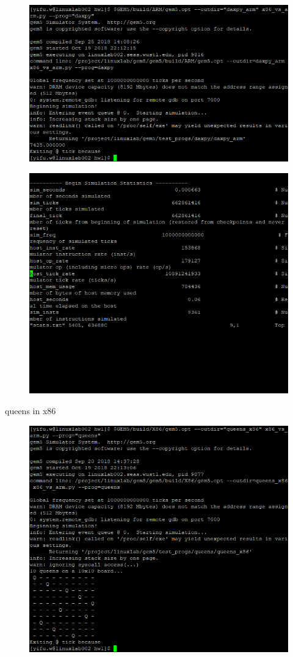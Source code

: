 \documentclass{article}
\begin{document}
\begin{figure}[H]\centering\includegraphics{2.png}\end{figure}
\begin{figure}[H]\centering\includegraphics{10.png}\end{figure}
queens in x86
\begin{figure}[H]\centering\includegraphics{3.png}\end{figure}
\end{document}
